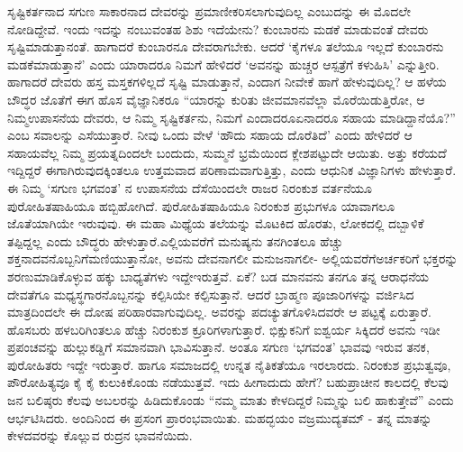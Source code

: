 ಸೃಷ್ಟಿಕರ್ತನಾದ ಸಗುಣ ಸಾಕಾರನಾದ ದೇವರನ್ನು ಪ್ರಮಾಣೀಕರಿಸಲಾಗುವುದಿಲ್ಲ ಎಂಬುದನ್ನು ಈ ಮೊದಲೇ ನೋಡಿದ್ದೇವೆ. ಇಂದು ಇದನ್ನು ನಂಬುವಂತಹ ಶಿಶು ಇದೆಯೇನು? ಕುಂಬಾರನು ಮಡಕೆ ಮಾಡುವಂತೆ ದೇವರು ಸೃಷ್ಟಿಮಾಡುತ್ತಾನಂತೆ. ಹಾಗಾದರೆ ಕುಂಬಾರನೂ ದೇವರಾಗಬೇಕು. ಆದರೆ ‘ಕೈಗಳೂ ತಲೆಯೂ ಇಲ್ಲದೆ ಕುಂಬಾರನು ಮಡಕೆಮಾಡುತ್ತಾನೆ’ ಎಂದು ಯಾರಾದರೂ ನಿಮಗೆ ಹೇಳಿದರೆ ‘ಅವನನ್ನು ಹುಚ್ಚರ ಆಸ್ಪತ್ರೆಗೆ ಕಳುಹಿಸಿ’ ಎನ್ನುತ್ತೀರಿ. ಹಾಗಾದರೆ ದೇವರು ಹಸ್ತ ಮಸ್ತಕಗಳಿಲ್ಲದೆ ಸೃಷ್ಟಿ ಮಾಡುತ್ತಾನೆ, ಎಂದಾಗ ನೀವೇಕೆ ಹಾಗೆ ಹೇಳುವುದಿಲ್ಲ? ಆ ಹಳೆಯ ಬೌದ್ಧರ ಜೊತೆಗೆ ಈಗ ಹೊಸ ವೈಜ್ಞಾ\-ನಿಕರೂ “ಯಾರನ್ನು ಕುರಿತು ಜೀವಮಾನವೆಲ್ಲಾ ಮೊರೆಯಿಡುತ್ತಿರೋ, ಆ ನಿಮ್ಮ\break ಉಪಾಸನೆಯ ದೇವರು, ಆ ನಿಮ್ಮ ಸೃಷ್ಟಿಕರ್ತನು, ನಿಮಗೆ ಎಂದಾದರೂ\break ಏನಾದರೂ ಸಹಾಯ ಮಾಡಿದ್ದಾನೆಯೊ?” ಎಂಬ ಸವಾಲನ್ನು ಎಸೆಯುತ್ತಾರೆ. ನೀವು ಒಂದು ವೇಳೆ ‘ಹೌದು ಸಹಾಯ ದೊರೆತಿದೆ’ ಎಂದು ಹೇಳಿದರೆ ಆ ಸಹಾಯವೆಲ್ಲ ನಿಮ್ಮ ಪ್ರಯತ್ನದಿಂದಲೇ ಬಂದುದು, ಸುಮ್ಮನೆ ಭ್ರಮೆಯಿಂದ ಕ್ಲೇಶಪಟ್ಟುದೇ ಆಯಿತು. ಅತ್ತು ಕರೆಯದೆ ಇದ್ದಿದ್ದರೆ ಈಗಾಗಿರುವುದಕ್ಕಿಂತಲೂ ಉತ್ತಮವಾದ ಪರಿಣಾಮವಾಗುತ್ತಿತ್ತು, ಎಂದು ಆಧುನಿಕ ವಿಜ್ಞಾನಿಗಳು ಹೇಳುತ್ತಾರೆ. ಈ ನಿಮ್ಮ ‘ಸಗುಣ ಭಗವಂತ’ ನ ಉಪಾಸನೆಯ ದೆಸೆಯಿಂದಲೇ ರಾಜರ ನಿರಂಕುಶ ವರ್ತನೆಯೂ ಪುರೋಹಿತಷಾಹಿಯೂ ಹಬ್ಬಿಹೋಗಿದೆ. ಪುರೋಹಿತಷಾಹಿಯೂ ನಿರಂಕುಶ ಪ್ರಭುಗಳೂ ಯಾವಾಗಲೂ ಜೊತೆಯಾಗಿಯೇ ಇರುವುವು. ಈ ಮಹಾ ಮಿಥ್ಯೆಯ ತಲೆಯನ್ನು ಮೊಟಕಿದ ಹೊರತು, ಲೋಕದಲ್ಲಿ ದಬ್ಬಾಳಿಕೆ ತಪ್ಪಿದ್ದಲ್ಲ ಎಂದು ಬೌದ್ಧರು ಹೇಳುತ್ತಾರೆ.\break ಎಲ್ಲಿಯವರೆಗೆ ಮನುಷ್ಯನು ತನಗಿಂತಲೂ ಹೆಚ್ಚು ಶಕ್ತನಾದವನೊಬ್ಬನಿಗೆ\break ಮಣಿಯುತ್ತಾನೋ, ಅವನು ದೇವನಾಗಲೀ ಮನುಜನಾಗಲೀ- ಅಲ್ಲಿಯವರೆಗೆ\break ಅರ್ಚಕರಿಗೆ ಭಕ್ತರನ್ನು ಶರಣುಮಾಡಿಕೊಳ್ಳುವ ಹಕ್ಕು ಬಾಧ್ಯತೆಗಳು ಇದ್ದೇ\break ಇರುತ್ತವೆ. ಏಕೆ? ಬಡ ಮಾನವನು ತನಗೂ ತನ್ನ ಆರಾಧನೆಯ ದೇವತೆಗೂ ಮಧ್ಯಸ್ಥಗಾರನೊಬ್ಬನನ್ನು ಕಲ್ಪಿಸಿಯೇ ಕಲ್ಪಿಸುತ್ತಾನೆ. ಆದರೆ ಬ್ರಾಹ್ಮಣ ಪೂಜಾರಿಗಳನ್ನು ವರ್ಜಿಸಿದ ಮಾತ್ರದಿಂದಲೇ ಈ ದೋಷ ಪರಿಹಾರವಾಗುವುದಿಲ್ಲ. ಅವರನ್ನು ಪದಚ್ಯುತಗೊಳಿಸಿದವರೇ ಆ ಪಟ್ಟಕ್ಕೆ ಏರುತ್ತಾರೆ. ಹೊಸಬರು ಹಳಬರಿಗಿಂತಲೂ ಹೆಚ್ಚು ನಿರಂಕುಶ ಕ್ರೂರಿಗಳಾಗುತ್ತಾರೆ. ಭಿಕ್ಷುಕನಿಗೆ ಐಶ್ವರ್ಯ ಸಿಕ್ಕಿದರೆ ಅವನು ಇಡೀ ಪ್ರಪಂಚವನ್ನು ಹುಲ್ಲುಕಡ್ಡಿಗೆ ಸಮಾನವಾಗಿ ಭಾವಿಸುತ್ತಾನೆ. ಅಂತೂ ಸಗುಣ ‘ಭಗವಂತ’ ಭಾವವು ಇರುವ ತನಕ, ಪುರೋಹಿತರು ಇದ್ದೇ ಇರುತ್ತಾರೆ. ಹಾಗೂ ಸಮಾಜದಲ್ಲಿ ಉನ್ನತ ನೈತಿಕತೆಯೂ ಇರಲಾರದು. ನಿರಂಕುಶ ಪ್ರಭುತ್ವವೂ, ಪೌರೋಹಿತ್ಯವೂ ಕೈ ಕೈ ಕುಲುಕಿಕೊಂಡು ನಡೆಯುತ್ತವೆ. ಇದು ಹೀಗಾದುದು ಹೇಗೆ? ಬಹುಪ್ರಾಚೀನ ಕಾಲದಲ್ಲಿ ಕೆಲವು ಜನ ಬಲಿಷ್ಠರು ಕೆಲವು ಅಬಲರನ್ನು ಹಿಡಿದುಕೊಂಡು “ನಮ್ಮ ಮಾತು ಕೇಳದಿದ್ದರೆ ನಿಮ್ಮನ್ನು ಬಲಿ ಹಾಕುತ್ತೇವೆ” ಎಂದು ಆರ್ಭಟಿಸಿದರು. ಅಂದಿನಿಂದ ಈ ಪ್ರಸಂಗ ಪ್ರಾರಂಭವಾಯಿತು. ಮಹದ್ಭಯಂ ವಜ್ರಮುದ್ಯತಮ್​ - ತನ್ನ ಮಾತನ್ನು ಕೇಳದವರನ್ನು ಕೊಲ್ಲುವ ರುದ್ರನ ಭಾವನೆಯಿದು.

